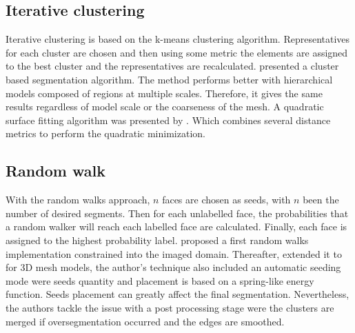


\subsection{Iterative clustering}

Iterative clustering is based on the k-means clustering algorithm.
Representatives for each cluster are chosen and then using some metric  the elements are assigned to the best cluster and the representatives are recalculated.
\cite{Lai2006} presented a cluster based segmentation algorithm.
The method performs better with hierarchical models composed of regions at multiple scales.
Therefore, it gives the same results regardless of model scale or the coarseness of the mesh.
A quadratic surface fitting algorithm was presented by \cite{Yan2012}.
Which combines several distance metrics to perform the quadratic minimization.



\subsection{Random walk}

With the random walks approach, $n$ faces are chosen as seeds, with $n$ been the number of desired segments.
Then for each unlabelled face, the probabilities that a random walker will reach each labelled face are calculated.
Finally, each face is assigned to the highest probability label.
\cite{Grady2006} proposed a first random walks implementation constrained into the imaged domain.
Thereafter, \cite{Lai2009} extended it to for 3D mesh models, the author's technique also included an automatic seeding mode were seeds quantity and placement is based on a spring-like energy function.
Seeds placement can greatly affect the final segmentation.
Nevertheless, the authors tackle the issue with a post processing stage were the clusters are merged if oversegmentation occurred and the edges are smoothed.
 


